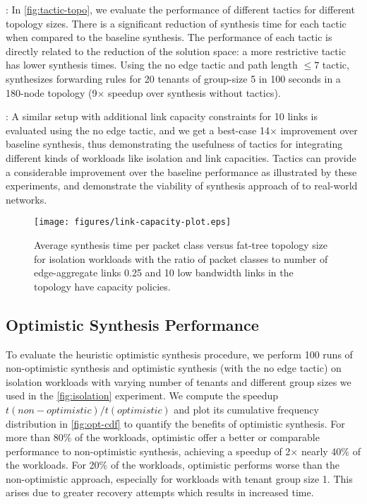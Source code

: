 : 
In \cref{fig:tactic-topo},
 we evaluate the performance of different tactics for different topology sizes. There is a
 significant reduction of synthesis time for each tactic when compared to the baseline synthesis.
 The performance of each tactic is directly related to the reduction of the solution space: a more
 restrictive tactic has lower synthesis times. 
  Using the no edge tactic
 and path length $\leq 7$ tactic, \Name synthesizes forwarding rules for 20 tenants of group-size 5 in 100 seconds in a 180-node
 topology (9$\times$ speedup over synthesis without tactics).
  
  : 
 A similar setup with additional link capacity 
 constraints for 10 links is evaluated using the no edge tactic, and we get a best-case 14$\times$
 improvement over baseline synthesis, thus demonstrating the usefulness of tactics for 
 integrating different kinds of workloads like isolation and link capacities. 
 Tactics can provide 
 a considerable improvement over the baseline performance as illustrated by these experiments,
 and demonstrate the viability of synthesis approach of \Name to real-world networks.  
 
\begin{figure}[h]
	\texttt{[image: figures/link-capacity-plot.eps]}
	\caption{Average synthesis time per packet class versus fat-tree topology size for isolation workloads 
		with the ratio of packet classes to number of edge-aggregate links 0.25 and 10 low bandwidth links in the topology 
		have capacity policies.}
	\label{fig:link-capacity}
\end{figure}


\subsection{Optimistic Synthesis Performance} \label{sec:optimisticeval}
To evaluate the heuristic optimistic synthesis procedure, we perform 100 runs of non-optimistic
 synthesis and optimistic synthesis (with the no edge tactic) on isolation
 workloads with varying number of tenants and different group sizes 
we used in the \cref{fig:isolation} experiment. We compute the
 speedup $t(non-optimistic)/t(optimistic)$ and plot its cumulative frequency
  distribution in \cref{fig:opt-cdf} to quantify the benefits of optimistic 
  synthesis. For more than 80\% of the
workloads, optimistic offer a better or comparable performance to non-optimistic synthesis, 
achieving a speedup of 2$\times$ nearly 40\% of the workloads. For 20\% of the workloads, optimistic
performs worse than the non-optimistic approach, especially for workloads with tenant group size 1. 
This arises due to greater recovery attempts which results in increased time. 

